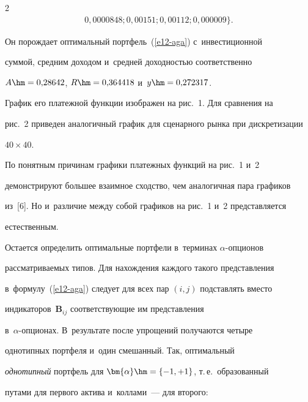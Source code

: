 \begin{multicols}{2}
\begin{multline*}
   0{,}0000848; 0{,}00151; 0{,}00112;  0{,}000009\}. 


  \end{multline*}


  


  \vspace*{-2pt}





  


  Он порождает оптимальный портфель~(\ref{e12-aga}) с~инвестиционной 


суммой, средним доходом и~средней доходностью соответственно 


  $A\hm=0{,}28642$,  $R\hm=0{,}364418$  и~$y\hm=0{,}272317$. 


      График его платежной функции изображен на рис.~1. Для сравнения на 


рис.~2 приведен аналогичный график для сценарного рынка при дискретизации 


$40\times40$.


  





  По понятным причинам графики платежных функций на рис.~1 и~2 


демонстрируют большее взаимное сходство, чем аналогичная пара графиков 


из~[6]. Но и~различие между собой графиков на рис.~1 и~2 пред\-став\-ля\-ет\-ся 


естественным. 


  


  Остается определить оптимальные портфели в~терминах $\alpha$-оп\-ци\-онов 


рас\-смат\-ри\-ва\-емых типов. Для нахождения каждого такого пред\-став\-ле\-ния 


в~формулу~(\ref{e12-aga}) следует для всех пар $(i,j)$ под\-став\-лять вмес\-то 


индикаторов~$\bm{B}_{ij}$ со\-от\-вет\-ст\-ву\-ющие им пред\-став\-ле\-ния  


в~$\alpha$-оп\-ци\-онах. В~результате после упрощений получаются четыре 


однотипных портфеля и~один смешанный. Так, оптимальный 


\textit{однотипный} портфель для $\bm{\alpha}\hm= \{-1, +1\}$, т.\,е.\ образованный 


путами для первого актива и~коллами~--- для второго: 






\end{multicols}
